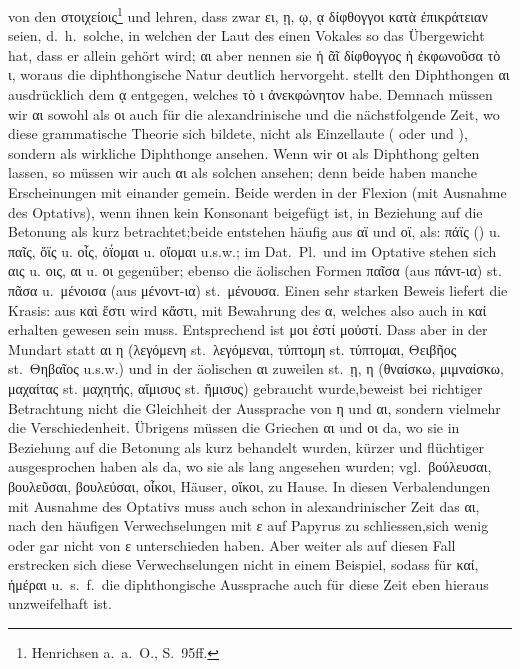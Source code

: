 von den στοιχείοις\footnote{Henrichsen a.~a.~O., S.\ 95ff.} und lehren, dass
zwar ει, ῃ, ῳ, ᾳ δίφθογγοι κατὰ ἐπικράτειαν seien, d.~h.~solche, in welchen der Laut des einen Vokales so das
Übergewicht hat, dass er allein gehört wird; αι aber nennen sie ἡ ᾶῖ δίφθογγος ἡ
ἐκφωνοῦσα τὸ ι, woraus die diphthongische Natur deutlich hervorgeht.
stellt den Diphthongen αι ausdrücklich dem ᾳ entgegen, welches τὸ ι ἀνεκφώνητον
habe. Demnach müssen wir αι sowohl als οι auch für die alexandrinische und die
nächstfolgende Zeit, wo diese grammatische Theorie sich bildete, nicht als
Einzellaute ( oder  und ), sondern als wirkliche
Diphthonge ansehen.
Wenn wir οι als Diphthong gelten lassen, so müssen wir auch αι als solchen
ansehen; denn beide haben manche Erscheinungen mit einander gemein.
Beide werden in der Flexion (mit Ausnahme des Optativs), wenn ihnen kein Konsonant beigefügt ist, in
Beziehung auf die Betonung als kurz betrachtet;beide entstehen häufig aus αϊ und
οϊ, als: πάϊς () u. παῖς, ὄϊς u. οἶς, ὀΐομαι u. οἴομαι
u.s.w.; im Dat.\ Pl.\ und im Optative stehen sich αις u. οις, αι u. οι
gegenüber; ebenso die äolischen Formen παῖσα (aus πάντ-ια) st. πᾶσα u.\ μένοισα
(aus μένοντ-ια) st.\ μένουσα.
Einen sehr starken Beweis liefert die Krasis: aus καὶ ἔστι wird κἄστι, mit Bewahrung
des α, welches also auch in καί erhalten gewesen sein muss. Entsprechend ist μοι
ἐστί μοὐστί.
Dass aber in der  Mundart statt αι η (λεγόμενη st.\ λεγόμεναι, τύπτομη st. τύπτομαι, Θειβῆος st.\ Θηβαῖος u.s.w.) und in der
äolischen αι zuweilen st.\ ῃ, η (θναίσκω, μιμναίσκω, μαχαίτας st. μαχητής, αἴμισυς
st. ἥμισυς) gebraucht wurde,beweist bei richtiger Betrachtung nicht die
Gleichheit der Aussprache von η und αι, sondern vielmehr die Verschiedenheit.
Übrigens müssen die Griechen αι und οι da, wo sie in Beziehung auf die Betonung
als kurz behandelt wurden, kürzer und flüchtiger ausgesprochen haben als da, wo
sie als lang angesehen wurden; vgl.\ βούλευσαι, βουλεῦσαι, βουλεύσαι, οἶκοι,
Häuser, οἴκοι, zu Hause. In diesen Verbalendungen mit Ausnahme des Optativs muss
auch schon in alexandrinischer Zeit das αι, nach den häufigen Verwechselungen mit
ε auf Papyrus zu schliessen,sich wenig oder gar nicht von ε unterschieden haben.
Aber weiter als auf diesen Fall erstrecken sich diese Verwechselungen nicht in
einem Beispiel,  sodass für καί, ἡμέραι u.~s.~f.\ die diphthongische Aussprache
auch für diese Zeit eben hieraus unzweifelhaft ist.

